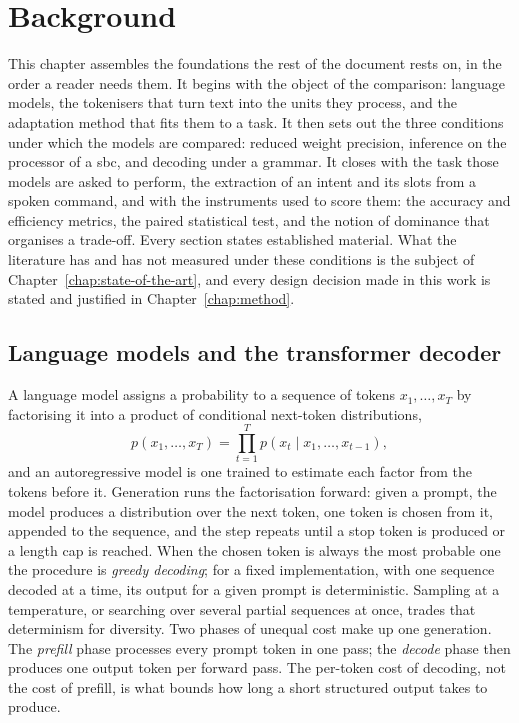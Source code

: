 \chapter{Background}
\label{chap:background}

This chapter assembles the foundations the rest of the document rests on, in the order a reader
needs them. It begins with the object of the comparison: language models, the tokenisers that
turn text into the units they process, and the adaptation method that fits them to a task. It
then sets out the three conditions under which the models are compared: reduced weight precision,
inference on the processor of a \gls{sbc}, and decoding under a grammar. It closes
with the task those models are asked to perform, the extraction of an intent and its slots from a
spoken command, and with the instruments used to score them: the accuracy and efficiency metrics,
the paired statistical test, and the notion of dominance that organises a trade-off. Every section
states established material. What the literature has and has not measured under these conditions
is the subject of Chapter~\ref{chap:state-of-the-art}, and every design decision made in this work
is stated and justified in Chapter~\ref{chap:method}.

\section{Language models and the transformer decoder}
\label{sec:bg-lm}

A language model assigns a probability to a sequence of tokens $x_1, \dots, x_T$ by factorising
it into a product of conditional next-token distributions,
\begin{equation}
    p(x_1, \dots, x_T) = \prod_{t=1}^{T} p(x_t \mid x_1, \dots, x_{t-1}),
    \label{eq:bg-autoregressive}
\end{equation}
and an autoregressive model is one trained to estimate each factor from the tokens before it.
Generation runs the factorisation forward: given a prompt, the model produces a distribution over
the next token, one token is chosen from it, appended to the sequence, and the step repeats until
a stop token is produced or a length cap is reached. When the chosen token is always the most
probable one the procedure is \emph{greedy decoding}; for a fixed implementation, with one
sequence decoded at a time, its output for a given prompt is deterministic. Sampling at a temperature, or searching over several partial sequences at once,
trades that determinism for diversity. Two phases of unequal cost make up one generation. The
\emph{prefill} phase processes every prompt token in one pass; the \emph{decode} phase then
produces one output token per forward pass. The per-token cost of decoding, not the cost of
prefill, is what bounds how long a short structured output takes to produce.

